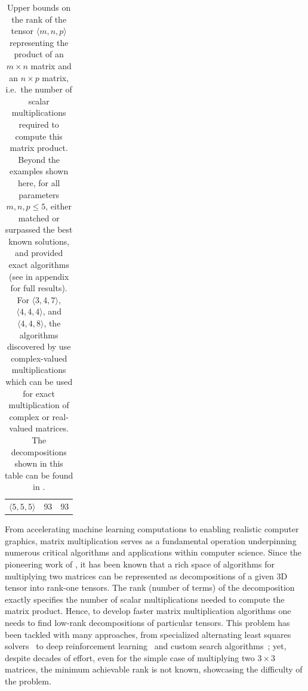 \begin{table}[t]
\begin{center}
\begin{tabular}{ccc}
    $\langle 5, 5, 5 \rangle$ & 93 \citep{flip_graphs_with_symmetry}  & 93  \\ 
    \end{tabular}
\caption{%
Upper bounds on the rank of the tensor $\langle m,n,p \rangle$ representing the product of an $m\times n$ matrix and an $n\times p$ matrix, i.e.~the number of scalar multiplications required to compute this matrix product.
Beyond the examples shown here, for all parameters $m,n,p\leq 5$, \method either matched or surpassed the best known solutions, and provided exact algorithms (see  in appendix for full results).
For $\langle 3, 4, 7\rangle$, $\langle 4, 4, 4\rangle$, and $\langle 4, 4, 8\rangle$, the algorithms discovered by \method use complex-valued multiplications which can be used for exact multiplication of complex or real-valued matrices.
The decompositions shown in this table can be found in \ResultsColab.%
}
    \label{tab:relaxed-opt-results}
\end{center}
\end{table}

From accelerating machine learning computations to enabling realistic computer graphics, matrix multiplication serves as a fundamental operation underpinning numerous critical algorithms and applications within computer science.
Since the pioneering work of \citet{strassen1969gaussian}, it has been known that a rich space of algorithms for multiplying two matrices can be represented as decompositions of a given 3D tensor into rank-one tensors.
The rank (number of terms) of the decomposition exactly specifies the number of scalar multiplications needed to compute the matrix product.
Hence, to develop faster matrix multiplication algorithms one needs to find low-rank decompositions of particular tensors.
This problem has been tackled with many approaches, from specialized alternating least squares solvers~\citep{smirnov2013bilinear} to deep reinforcement learning~\citep{fawzi2022discovering} and custom search algorithms~\cite{kauers2023flip}; yet, despite decades of effort, even for the simple case of multiplying two $3\times 3$ matrices, the minimum achievable rank is not known, showcasing the difficulty of the problem.

